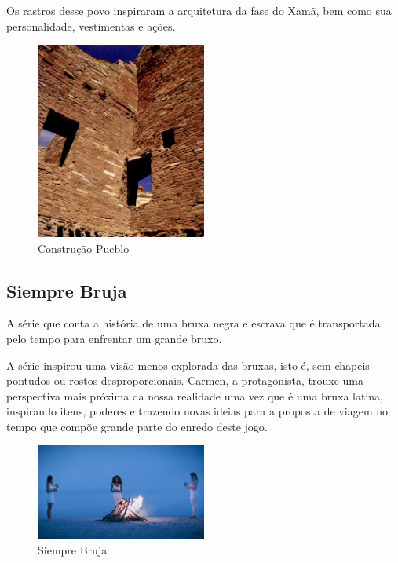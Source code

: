 Os rastros desse povo inspiraram a arquitetura da fase do Xamã, bem como sua personalidade, vestimentas e ações.

\begin{figure}[!htb] \caption{\label{fig_puebloan}Construção Pueblo} \begin{center}
\includegraphics[width=0.5\textwidth]{imagens/puebloans.png} \end{center}
 \end{figure}

\clearpage

\subsection{Siempre Bruja}

A série que conta a história de uma bruxa negra e escrava que é transportada pelo tempo para enfrentar um grande bruxo.

A série inspirou uma visão menos explorada das bruxas, isto é, sem chapeis pontudos ou rostos desproporcionais. Carmen, a protagonista, trouxe uma perspectiva mais próxima da nossa realidade uma vez que é uma bruxa latina, inspirando itens, poderes e trazendo novas ideias para a proposta de viagem no tempo que compõe grande parte do enredo deste jogo.

\begin{figure}[!htb] \caption{\label{siempre}Siempre Bruja} \begin{center}
\includegraphics[width=0.5\textwidth]{imagens/SiempreBruja.jpg} \end{center}
 \end{figure}

